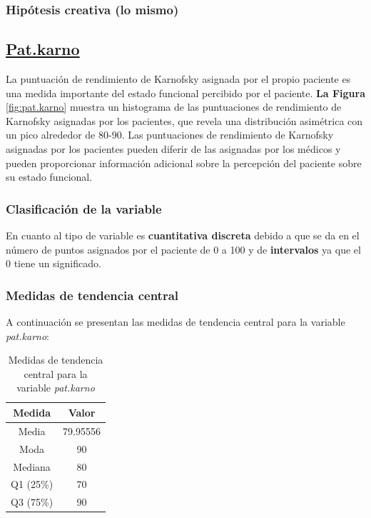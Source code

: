\documentclass[a4paper,12pt]{article}
\begin{document}
    \subsubsection*{Hipótesis creativa (lo mismo)}

    \subsection*{\underline{Pat.karno}}

    La puntuación de rendimiento de Karnofsky asignada por el propio paciente es una medida importante del estado funcional percibido por el paciente. \textbf{La Figura }\ref{fig:pat.karno} muestra un histograma de las puntuaciones de rendimiento de Karnofsky asignadas por los pacientes, que revela una distribución asimétrica con un pico alrededor de 80-90. Las puntuaciones de rendimiento de Karnofsky asignadas por los pacientes pueden diferir de las asignadas por los médicos y pueden proporcionar información adicional sobre la percepción del paciente sobre su estado funcional.

    \subsubsection*{Clasificación de la variable}

    En cuanto al tipo de variable es \textbf{cuantitativa discreta} debido a que se da en el número de puntos asignados por el paciente de 0 a 100 y de \textbf{intervalos} ya que el 0 tiene un significado.

    \subsubsection*{Medidas de tendencia central}

    A continuación se presentan las medidas de tendencia central para la variable \textit{pat.karno}:
    
    \begin{table}[h!]
        \centering
        \begin{tabular}{|c|c|}
            \hline
            \textbf{Medida} & \textbf{Valor} \\
            \hline
            Media & 79.95556 \\
            \hline
            Moda & 90 \\
            \hline
            Mediana & 80 \\
            \hline
            Q1 (25\%) & 70 \\
            \hline
            Q3 (75\%) & 90 \\
            \hline
        \end{tabular}
        \caption{Medidas de tendencia central para la variable \textit{pat.karno}}
        \label{tab:medidas_tendencia_central_pat_karno}
    \end{table}
\end{document}
